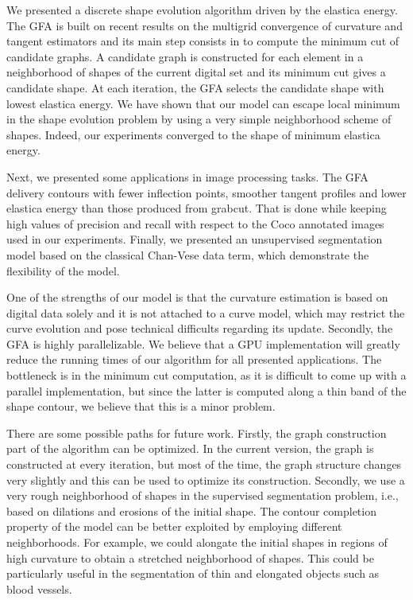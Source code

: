 \documentclass[smallextended]{svjour3}
\begin{document}
We presented a discrete shape evolution algorithm driven by the elastica energy. The GFA is built on recent results on the multigrid convergence of curvature and tangent estimators and its main step consists in to compute the minimum cut of candidate graphs. A candidate graph is constructed for each element in a neighborhood of shapes of the current digital set and its minimum cut gives a candidate shape. At each iteration, the GFA selects the candidate shape with lowest elastica energy. We have shown that our model can escape local minimum in the shape evolution problem by using a very simple neighborhood scheme of shapes. Indeed, our experiments converged to the shape of minimum elastica energy. 

Next, we presented some applications in image processing tasks. The GFA delivery contours with fewer inflection points, smoother tangent profiles and lower elastica energy than those produced from grabcut. That is done while keeping high values of precision and recall with respect to the Coco annotated images used in our experiments. Finally, we presented an unsupervised segmentation model based on the classical Chan-Vese data term, which demonstrate the flexibility of the model. 

One of the strengths of our model is that the curvature estimation is based on digital data solely and it is not attached to a curve model, which may restrict the curve evolution and pose technical difficults regarding its update. Secondly, the GFA is highly parallelizable. We believe that a GPU implementation will greatly reduce the running times of our algorithm for all presented applications. The bottleneck is in the minimum cut computation, as it is difficult to come up with a parallel implementation, but since the latter is computed along a thin band of the shape contour, we believe that this is a minor problem.

There are some possible paths for future work. Firstly, the graph construction part of the algorithm can be optimized. In the current version, the graph is constructed at every iteration, but most of the time, the graph structure changes very slightly and this can be used to optimize its construction. Secondly, we use a very rough neighborhood of shapes in the supervised segmentation problem, i.e., based on dilations and erosions of the initial shape. The contour completion property of the model can be better exploited by employing different neighborhoods. For example, we could alongate the initial shapes in regions of high curvature to obtain a stretched neighborhood of shapes. This could be particularly useful in the segmentation of thin and elongated objects such as blood vessels.


\printbibliography
\end{document}
